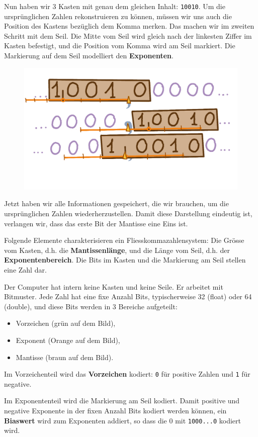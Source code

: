 Nun haben wir 3 Kasten mit genau dem gleichen Inhalt: \texttt{10010}. Um die ursprünglichen Zahlen rekonstruieren zu können, müssen wir uns auch die Position des Kastens bezüglich dem Komma merken. Das machen wir im zweiten Schritt mit dem Seil. Die Mitte vom Seil wird gleich nach der linkesten Ziffer im Kasten befestigt, und die Position vom Komma wird am Seil markiert. Die Markierung auf dem Seil modelliert den \textbf{Exponenten}.

\begin{figure}[H]
\centering
\includegraphics[width=0.65\linewidth]{Pictures/KastenMitSeil.png} 
\end{figure}

Jetzt haben wir alle Informationen gespeichert, die wir brauchen, um die ursprünglichen Zahlen wiederherzustellen. Damit diese Darstellung eindeutig ist, verlangen wir, dass das erste Bit der Mantisse eine Eins ist.

Folgende Elemente charakterisieren ein Fliesskommazahlensystem: Die Grösse vom Kasten, d.h. die \textbf{Mantissenlänge}, und die Länge vom Seil, d.h. der \textbf{Exponentenbereich}. Die Bits im Kasten und die Markierung am Seil stellen eine Zahl dar.

Der Computer hat intern keine Kasten und keine Seile. Er arbeitet mit Bitmuster. Jede Zahl hat eine fixe Anzahl Bits, typischerweise 32 (float) oder 64 (double), und diese Bits werden in \(3\) Bereiche aufgeteilt:
\begin{itemize}
\item Vorzeichen (grün auf dem Bild),
\item Exponent (Orange auf dem Bild),
\item Mantisse (braun auf dem Bild). 
\end{itemize}
Im Vorzeichenteil wird das \textbf{Vorzeichen} kodiert: \texttt{0} für positive Zahlen und \texttt{1} für negative.

Im Exponententeil wird die Markierung am Seil kodiert. Damit positive und negative Exponente in der fixen Anzahl Bits kodiert werden können, ein  \textbf{Biaswert} wird zum Exponenten addiert, so dass die \(0\) mit \texttt{1000...0} kodiert wird.


